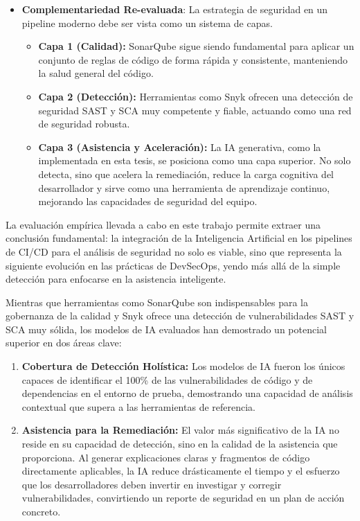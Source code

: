 \begin{itemize}
    \item \textbf{Complementariedad Re-evaluada}: La estrategia de seguridad en un pipeline moderno debe ser vista como un sistema de capas.
        \begin{itemize}
            \item \textbf{Capa 1 (Calidad):} SonarQube sigue siendo fundamental para aplicar un conjunto de reglas de código de forma rápida y consistente, manteniendo la salud general del código.
            \item \textbf{Capa 2 (Detección):} Herramientas como Snyk ofrecen una detección de seguridad SAST y SCA muy competente y fiable, actuando como una red de seguridad robusta.
            \item \textbf{Capa 3 (Asistencia y Aceleración):} La IA generativa, como la implementada en esta tesis, se posiciona como una capa superior. No solo detecta, sino que acelera la remediación, reduce la carga cognitiva del desarrollador y sirve como una herramienta de aprendizaje continuo, mejorando las capacidades de seguridad del equipo.
        \end{itemize}
\end{itemize}

La evaluación empírica llevada a cabo en este trabajo permite extraer una conclusión fundamental: la integración de la Inteligencia Artificial en los pipelines de CI/CD para el análisis de seguridad no solo es viable, sino que representa la siguiente evolución en las prácticas de DevSecOps, yendo más allá de la simple detección para enfocarse en la asistencia inteligente.

Mientras que herramientas como SonarQube son indispensables para la gobernanza de la calidad y Snyk ofrece una detección de vulnerabilidades SAST y SCA muy sólida, los modelos de IA evaluados han demostrado un potencial superior en dos áreas clave:
\begin{enumerate}
    \item \textbf{Cobertura de Detección Holística:} Los modelos de IA fueron los únicos capaces de identificar el 100\% de las vulnerabilidades de código y de dependencias en el entorno de prueba, demostrando una capacidad de análisis contextual que supera a las herramientas de referencia.
    \item \textbf{Asistencia para la Remediación:} El valor más significativo de la IA no reside en su capacidad de detección, sino en la calidad de la asistencia que proporciona. Al generar explicaciones claras y fragmentos de código directamente aplicables, la IA reduce drásticamente el tiempo y el esfuerzo que los desarrolladores deben invertir en investigar y corregir vulnerabilidades, convirtiendo un reporte de seguridad en un plan de acción concreto.
\end{enumerate}

